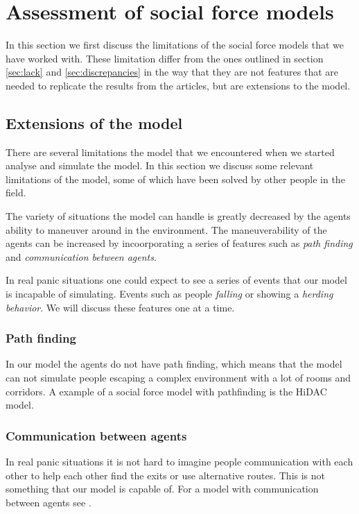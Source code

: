 \section{Assessment of social force models}
\label{sec:assessment}
In this section we first discuss the limitations of the social force models 
that we have worked with. These limitation differ from the ones outlined in 
section \ref{sec:lack} and \ref{sec:discrepancies} in the way that 
they are not features that are needed to replicate the results from the articles, 
but are extensions to the model.

\subsection{Extensions of the model}
There are several limitations the model that we encountered when we started 
analyse and simulate the model. In this section we discuss some relevant 
limitations of the model, some of which have been solved by other people in the 
field. 

The variety of situations the model can handle is greatly decreased by the 
agents ability to maneuver around in the environment. The maneuverability of 
the agents can be increased by incoorporating a series of features such as 
\emph{path finding} and \emph{communication between agents}. 

In real panic situations one could expect to see a series of events that our 
model is incapable of simulating. Events such as people \emph{falling} or showing a 
\emph{herding behavior}. We will discuss these features one at a time.

\subsubsection{Path finding}
In our model the agents do not have path finding, which means that the model 
can not simulate people escaping a complex environment with a lot of rooms 
and corridors. A example of a social force model with pathfinding is the HiDAC 
model\cite{HiDAC}.

\subsubsection{Communication between agents}
In real panic situations it is not hard to imagine people communication with 
each other to help each other find the exits or use alternative routes. This is 
not something that our model is capable of. For a model with communication between 
agents see \cite{HiDAC}.


